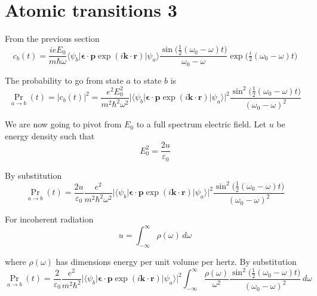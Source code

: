 

\section*{Atomic transitions 3}

From the previous section
\begin{equation*}
c_b(t)=\frac{ieE_0}{m\hbar\omega}
\langle\psi_b|\boldsymbol{\epsilon}\cdot\mathbf p\exp(i\mathbf k\cdot\mathbf r)|\psi_a\rangle
\frac{\sin\bigl(\tfrac{1}{2}(\omega_0-\omega)t\bigr)}{\omega_0-\omega}
\exp\bigl(\tfrac{i}{2}(\omega_0-\omega)t\bigr)
\end{equation*}

The probability to go from state $a$ to state $b$ is
\begin{equation*}
\Pr_{a\rightarrow b}(t)=|c_b(t)|^2
=\frac{e^2E_0^2}{m^2\hbar^2\omega^2}
\bigl|\langle\psi_b|\boldsymbol{\epsilon}\cdot\mathbf p\exp(i\mathbf k\cdot\mathbf r)|\psi_a\rangle\bigr|^2
\frac{\sin^2\bigl(\tfrac{1}{2}(\omega_0-\omega)t\bigr)}{(\omega_0-\omega)^2}
\end{equation*}

We are now going to pivot from $E_0$ to a full spectrum electric field.
Let $u$ be energy density such that
\begin{equation*}
E_0^2=\frac{2u}{\varepsilon_0}
\end{equation*}

By substitution
\begin{equation*}
\Pr_{a\rightarrow b}(t)
=\frac{2u}{\varepsilon_0}
\frac{e^2}{m^2\hbar^2\omega^2}
\bigl|\langle\psi_b|\boldsymbol{\epsilon}\cdot\mathbf p\exp(i\mathbf k\cdot\mathbf r)|\psi_a\rangle\bigr|^2
\frac{\sin^2\bigl(\tfrac{1}{2}(\omega_0-\omega)t\bigr)}{(\omega_0-\omega)^2}
\end{equation*}

For incoherent radiation
\begin{equation*}
u=\int_{-\infty}^\infty\rho(\omega)\,d\omega
\end{equation*}

where $\rho(\omega)$ has dimensions energy per unit volume per hertz.
By substitution
\begin{equation*}
\Pr_{a\rightarrow b}(t)
=\frac{2}{\varepsilon_0}
\frac{e^2}{m^2\hbar^2}
\bigl|\langle\psi_b|\boldsymbol{\epsilon}\cdot\mathbf p\exp(i\mathbf k\cdot\mathbf r)|\psi_a\rangle\bigr|^2
\int_{-\infty}^\infty\frac{\rho(\omega)}{\omega^2}
\frac{\sin^2\bigl(\tfrac{1}{2}(\omega_0-\omega)t\bigr)}{(\omega_0-\omega)^2}\,d\omega
\end{equation*}

